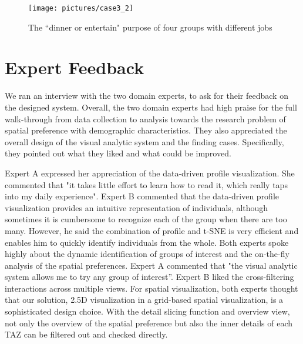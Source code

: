 \documentclass{ieeeaccess}
\begin{document}
\begin{figure}[htb!]
 \centering %
 \texttt{[image: pictures/case3\_2]}
 \caption{The ``dinner or entertain" purpose of four groups with different jobs}
 \label{case32}
\end{figure}




\section{Expert Feedback}

We ran an interview with the two domain experts, to ask for their feedback on the designed system. Overall, the two domain experts had high praise for the full walk-through from data collection to analysis towards the research problem of spatial preference with demographic characteristics. They also appreciated the overall design of the visual analytic system and the finding cases. Specifically, they pointed out what they liked and what could be improved.

Expert A expressed her appreciation of the data-driven profile visualization. She commented that "it takes little effort to learn how to read it, which really taps into my daily experience". Expert B commented that the data-driven profile visualization provides an intuitive representation of individuals, although sometimes it is cumbersome to recognize each of the group when there are too many. However, he said the combination of profile and t-SNE is very efficient and enables him to quickly identify individuals from the whole. Both experts spoke highly about the dynamic identification of groups of interest and the on-the-fly analysis of the spatial preferences. Expert A commented that "the visual analytic system allows me to try any group of interest''. Expert B liked the cross-filtering interactions across multiple views. For spatial visualization, both experts thought that our solution, 2.5D visualization in a grid-based spatial visualization, is a sophisticated design choice. With the detail slicing function and overview view, not only the overview of the spatial preference but also the inner details of each TAZ can be filtered out and checked directly.
\end{document}
